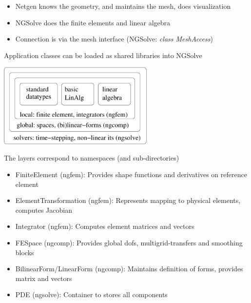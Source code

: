 \documentclass[20pt,landscape,footrule]{foils}
\begin{document}
\begin{itemize}
\item Netgen knows the geometry, and maintains the mesh, does visualization
\item NGSolve does the finite elements and linear algebra
\item Connection is via the mesh interface (NGSolve: {\em class MeshAccess})
\end{itemize}

Application classes can be loaded as shared libraries into NGSolve



\begin{center}
\includegraphics[width=0.6\textwidth]{layers.pdf} 
\end{center}

\vspace{2em}

The layers correspond to namespaces (and sub-directories)


%
\begin{itemize}
\item FiniteElement (ngfem): \newline
  Provides shape functions and derivatives on reference element
\item ElementTransformation (ngfem): \newline
  Represents mapping to physical elements, computes Jacobian
\item Integrator (ngfem): \newline
  Computes element matrices and vectors 
\item FESpace (ngcomp): \newline
  Provides global dofs, multigrid-transfers and smoothing blocks
\item BilinearForm/LinearForm (ngcomp): \newline
  Maintains definition of forms, provides matrix and vectors
\item PDE (ngsolve): \newline
  Container to stores all components
\end{itemize}
\end{document}
